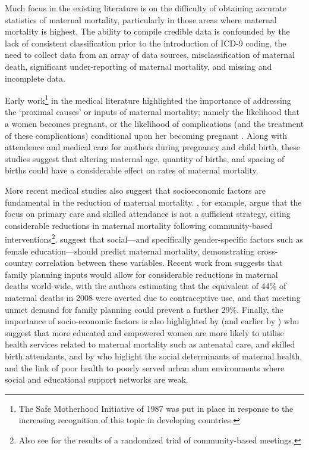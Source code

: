 \documentclass{article}[12pt,subeqn]
\begin{document}
\begin{spacing}{1.4}
Much focus in the existing literature is on the difficulty of obtaining accurate 
statistics of maternal mortality, particularly in those areas where maternal 
mortality is highest\citep{RonsmansGraham2006, MccarthyMaine1992, 
McAlisterBaskett2006}.  The ability to compile credible data is confounded by the 
lack of consistent classification prior to the introduction of ICD-9 coding, the 
need to collect data from an array of data sources, misclassification of maternal 
death, significant under-reporting of maternal mortality, and missing and 
incomplete data\citep{Yazbeck2007, Hoganetal2010}.

Early work\footnote{The Safe Motherhood Initiative of 1987 was put in place in 
response to the increasing recognition of this topic in developing countries.} 
in the medical literature highlighted the importance of addressing the `proximal 
causes' or inputs of maternal mortality; namely the likelihood that a women 
becomes pregnant, or the likelihood of complications (and the treatment of these 
complications) conditional upon her becoming pregnant \citep{MccarthyMaine1992, 
GoodburnCampbell2001, TrusselPebley1984}.  Along with attendence and medical 
care for mothers during pregnancy and child birth, these studies suggest that 
altering maternal age, quantity of births, and spacing of births could have a 
considerable effect on rates of maternal mortality.  

More recent medical studies also suggest that socioeconomic factors are 
fundamental in the reduction of maternal mortality.  \citet{Costelloetal2004}, 
for example, argue that the focus on primary care and skilled attendance is 
not a sufficient strategy, citing considerable reductions in maternal mortality 
following community-based interventions\footnote{Also see 
\citet{Manandharetal2004} for the results of a randomized trial of 
community-based meetings.}.  \citet{McAlisterBaskett2006} suggest that 
social---and specifically gender-specific factors such as female 
education---should predict maternal mortality, demonstrating cross-country 
correlation between these variables. Recent work from \citet{Ahmedetal2012} 
suggests that family planning inputs would allow for considerable reductions in 
maternal deaths world-wide, with the authors estimating that the equivalent of 
44\% of maternal deaths in 2008 were averted due to contraceptive use, and that 
meeting unmet demand for family planning could prevent a further 29\%. Finally, 
the importance of socio-economic factors is also highlighted by 
\citet{Ahmedetal2010} (and earlier by \citet{ShenWilliamson1999}) who suggest 
that more educated and empowered women are more likely to utilise health 
services related to maternal mortality such as antenatal care, and skilled 
birth attendants, and by \citet{BhuttaBlack2013} who higlight the social 
determinants of maternal health, and the link of poor health to poorly served 
urban slum environments where social and educational support networks are weak.


\end{spacing}
\end{document}
